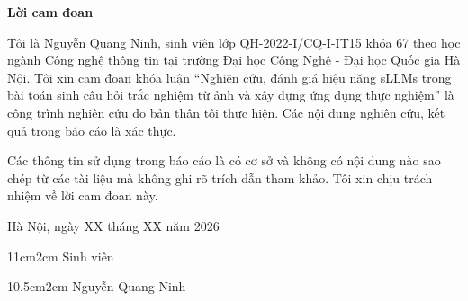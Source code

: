 \setcounter{page}{1}
\begin{center}
\textbf{\large{Lời cam đoan}	}
\end{center}
Tôi là Nguyễn Quang Ninh, sinh viên lớp QH-2022-I/CQ-I-IT15 khóa 67 theo học ngành Công nghệ thông tin tại trường Đại học Công Nghệ - Đại học Quốc gia Hà Nội. Tôi xin cam đoan
khóa luận ``Nghiên cứu, đánh giá hiệu năng sLLMs trong bài toán sinh câu hỏi trắc nghiệm từ ảnh và xây dựng ứng dụng thực nghiệm'' là công trình nghiên cứu do bản thân tôi thực hiện. Các nội dung nghiên cứu, kết quả trong báo cáo là xác thực.

Các thông tin sử dụng trong báo cáo là có cơ sở và không có nội dung nào sao chép từ các tài liệu mà không ghi rõ trích dẫn tham khảo. Tôi xin chịu trách nhiệm về lời cam đoan này.

\begin{flushright}
Hà Nội, ngày XX tháng XX năm 2026   
\end{flushright}

\begin{changemargin}{11cm}{2cm}
Sinh viên
\\[2cm]
\end{changemargin}

\begin{changemargin}{10.5cm}{2cm}
Nguyễn Quang Ninh
\end{changemargin}